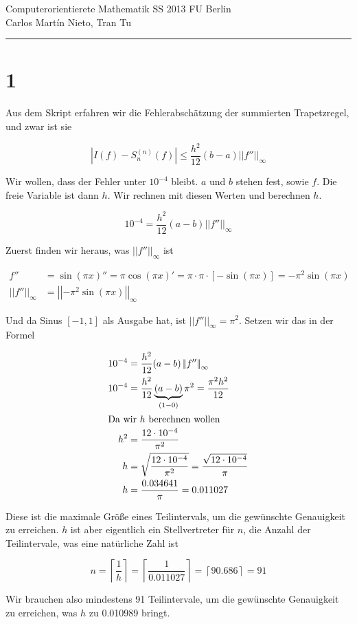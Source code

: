 \documentclass[ngerman,a4paper]{scrartcl}
\newcommand{\norm}[1]{\left|\!\left|#1\right|\! \right|}
\begin{document}
{\sffamily
  \hfill
  Computerorientierete Mathematik SS 2013\hfill
  FU Berlin\\[8pt]
  \hfill Carlos Martín Nieto, Tran Tu\hrule \bigskip
}

\section*{1}

Aus dem Skript erfahren wir die Fehlerabschätzung der summierten Trapetzregel, und zwar ist sie

\[
|I(f) - S^{(n)}_n(f)| \leq \frac{h^2}{12}(b-a)\norm{f''}_\infty
\]

Wir wollen, dass der Fehler unter $10^{-4}$ bleibt. $a$ und $b$ stehen fest, sowie $f$. Die freie Variable ist dann $h$. Wir rechnen mit diesen Werten und berechnen $h$.

\[
  10^{-4} = \frac{h^2}{12} (a-b) \norm{f''}_\infty
\]

Zuerst finden wir heraus, was $\norm{f''}_\infty$ ist


\begin{align*}
  f'' &= \sin(\pi x)'' = \pi \cos(\pi x)' = \pi \cdot \pi \cdot       [-\sin(\pi x)] = -\pi^2 \sin(\pi x)\\
\norm{f''}_\infty &= \norm{-\pi^2 \sin(\pi x)}_\infty
\end{align*}

Und da Sinus $[-1, 1]$ als Ausgabe hat, ist $\norm{f''}_\infty = \pi^2$. Setzen wir das in der Formel

\begin{align*}
  10^{-4} &= \frac{h^2}{12} (a-b) \norm{f''}_\infty\\
  10^{-4} &= \frac{h^2}{12} \underbrace{(a-b)}_{(1 - 0)} \pi^2 = \frac{\pi^2 h^2}{12}\\
\intertext{Da wir $h$ berechnen wollen}
h^2 &= \frac{12\cdot 10^{-4}}{\pi^2}\\
h &= \sqrt{\frac{12\cdot 10^{-4}}{\pi^2}} = \frac{\sqrt{12\cdot 10^{-4}}}{\pi}\\
h &= \frac{0.034641}{\pi} = 0.011027
\end{align*}

Diese ist die maximale Größe eines Teilintervals, um die gewünschte Genauigkeit zu erreichen. $h$ ist aber eigentlich ein Stellvertreter für $n$, die Anzahl der Teilintervale, was eine natürliche Zahl ist

\[
n = \left\lceil \frac{1}{h} \right\rceil = \left\lceil \frac{1}{0.011027} \right\rceil = \left\lceil 90.686 \right\rceil = 91
\]

Wir brauchen also mindestens 91 Teilintervale, um die gewünschte Genauigkeit zu erreichen, was $h$ zu 0.010989 bringt.
\end{document}
